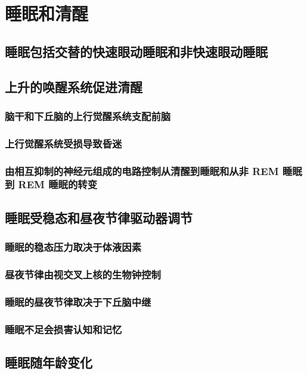\chapter{睡眠和清醒}

\section{睡眠包括交替的快速眼动睡眠和非快速眼动睡眠}

\section{上升的唤醒系统促进清醒}
\subsection{脑干和下丘脑的上行觉醒系统支配前脑}
\subsection{上行觉醒系统受损导致昏迷}
\subsection{由相互抑制的神经元组成的电路控制从清醒到睡眠和从非 REM 睡眠到 REM 睡眠的转变}

\section{睡眠受稳态和昼夜节律驱动器调节}
\subsection{睡眠的稳态压力取决于体液因素}
\subsection{昼夜节律由视交叉上核的生物钟控制}
\subsection{睡眠的昼夜节律取决于下丘脑中继}
\subsection{睡眠不足会损害认知和记忆}

\section{睡眠随年龄变化}
